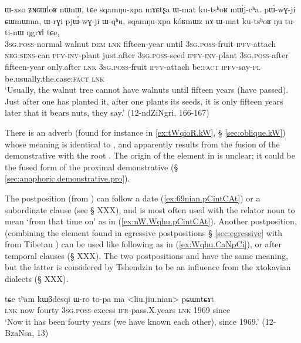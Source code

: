 \begin{exe}
\ex \label{ex:sqamNuxpa.koRmWz}
\gll ɯ-xso ʑɴɢɯloʁ nɯnɯ, tɕe sqamŋu-xpa mɤɕtʂa ɯ-mat ku-tsʰoʁ mɯ́j-cʰa. pɯ́-wɣ-ji ɕɯmɯma, ɯ-rɣi pjɯ́-wɣ-ji ɯ-qʰu,  sqamŋu-xpa kóʁmɯz nɤ ɯ-mat ku-tsʰoʁ ŋu tu-ti-nɯ ŋgrɤl tɕe,  \\
\textsc{3sg}.\textsc{poss}-normal walnut  \textsc{dem} \textsc{lnk} fifteen-year until \textsc{3sg}.\textsc{poss}-fruit \textsc{ipfv}-attach \textsc{neg}:\textsc{sens}-can \textsc{pfv}-\textsc{inv}-plant just.after \textsc{3sg}.\textsc{poss}-seed \textsc{ipfv}-\textsc{inv}-plant \textsc{3sg}.\textsc{poss}-after fifteen-year only.after \textsc{lnk} \textsc{3sg}.\textsc{poss}-fruit \textsc{ipfv}-attach be:\textsc{fact} \textsc{ipfv}-say-\textsc{pl} be.usually.the.case:\textsc{fact} \textsc{lnk} \\
\glt `Usually, the walnut tree cannot have walnuts until fifteen years (have passed). Just after one has planted it, after one plants its seeds, it is only fifteen years later that it bears nuts, they say.' (12-ndZiNgri, 166-167)
\end{exe}

There is an adverb  (found for instance in \ref{ex:tWqioR.kW}, § \ref{sec:oblique.kW}) whose meaning is identical to , and apparently results from the fusion of the demonstrative  with the root . The origin of the  element in  is unclear; it could be the fused form of the proximal demonstrative  (§ \ref{sec:anaphoric.demonstrative.pro}).

The postposition  (from ) can follow a date (\ref{ex:69nian.pCintCAt}) or a subordinate clause (see § XXX), and is most often used with the relator noun  to mean `from that time on' as in (\ref{ex:nW.Wqhu.pCintCAt}). Another postposition,   (combining the  element found in egressive postpositions § \ref{sec:egressive}  with  from Tibetan ) can be used like  following   as in (\ref{ex:Wqhu.CaNpCi}), or after temporal clauses (§ XXX). The two postpositions  and  have the same meaning, but the latter is considered by Tshendzin to be an influence from the xtokavian dialects (§ XXX).

 \begin{exe}
\ex \label{ex:69nian.pCintCAt}
 \gll tɕe tʰam kɯβdesqi ɯ-ro to-pa ma <liu.jiu.nian> pɕɯntɕɤt \\
 \textsc{lnk} now fourty \textsc{3sg}.\textsc{poss}-excess \textsc{ifr}-pass.X.years \textsc{lnk}  1969 since \\
 \glt `Now it has been fourty years (we have known each other), since 1969.' (12-BzaNsa, 13)
 \end{exe}
 
